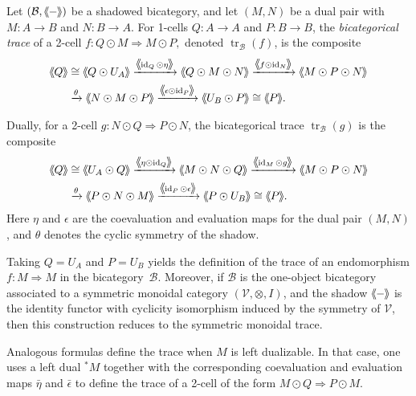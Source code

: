 \documentclass[11pt,oneside]{amsart}
\DeclareMathOperator{\tr}{tr}
\DeclareMathOperator{\id}{id}
\numberwithin{equation}{section}
\numberwithin{figure}{section}
\theoremstyle{plain}
\theoremstyle{definition}
\theoremstyle{remark}
\newcommand{\shspace}{\hspace{.5mm}} %
\newcommand{\sh}[1]{{\ensuremath{\shspace\hspace{1mm}\makebox[-1mm]{$\langle$}\makebox[0mm]{$\langle$}\hspace{1mm}{#1}\makebox[1mm]{$\rangle$}\makebox[0mm]{$\rangle$}\shspace}}}
\begin{document}
\begin{definition}\label{def:bicat-trace}
Let $(\mathcal B,\sh{-})$ be a shadowed bicategory, and let $(M,N)$ be a dual pair
with $M\colon A\to B$ and $N\colon B\to A$.
For 1-cells $Q\colon A\to A$ and $P\colon B\to B$, the \emph{bicategorical trace}
of a 2-cell \(f \colon Q \odot M \Rightarrow M \odot P,\) denoted \( \tr_{\mathcal B}(f) \), is the composite
\[
\begin{aligned}
\sh{Q}
&\cong \sh{Q \odot U_A}
\xrightarrow{\sh{\id_Q \odot \eta}}
\sh{Q \odot M \odot N}
\xrightarrow{\sh{f \odot \id_N}}
\sh{M \odot P \odot N}
\\
&\xrightarrow{\theta}
\sh{N \odot M \odot P}
\xrightarrow{\sh{\epsilon \odot \id_P}}
\sh{U_B \odot P}
\cong \sh{P}.
\end{aligned}
\]


Dually, for a 2-cell \( g\colon N \odot Q \Rightarrow P \odot N \), the bicategorical trace 
\( \operatorname{tr}_{\mathcal B}(g) \) is the composite
\[
\begin{aligned}
\sh{Q}
&\cong \sh{U_A \odot Q}
\xrightarrow{\sh{\eta \odot \id_Q}}
\sh{M \odot N \odot Q}
\xrightarrow{\sh{\id_M \odot g}}
\sh{M \odot P \odot N}
\\
&\xrightarrow{\theta}
\sh{P \odot N \odot M}
\xrightarrow{\sh{\id_P \odot \epsilon}}
\sh{P \odot U_B}
\cong \sh{P}.
\end{aligned}
\]
Here $\eta$ and $\epsilon$ are the coevaluation and evaluation maps for the dual pair $(M,N)$, and $\theta$ denotes the cyclic symmetry of the shadow.
\end{definition}


\begin{remark}Taking $Q = U_A$ and $P = U_B$ yields the definition of the trace of an endomorphism
\( f\colon M \Rightarrow M \) in the bicategory~$\mathcal B$.
Moreover, if \(\mathcal B\) is the one-object bicategory associated to a
symmetric monoidal category \((\mathcal V,\otimes,I)\), and the shadow
\(\sh{-}\) is the identity functor with cyclicity isomorphism induced by the
symmetry of \(\mathcal V\), then this construction reduces to the  
symmetric monoidal trace.

Analogous formulas define the trace when \(M\) is left dualizable. In that case,
one uses a left dual \({}^*M\) together with the corresponding coevaluation and
evaluation maps \(\bar{\eta}\) and \(\bar{\epsilon}\) to define the trace of a
2-cell of the form \( M \odot Q \Rightarrow P \odot M \).
\end{remark}
\end{document}
